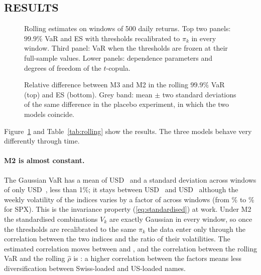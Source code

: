 \subsection{RESULTS}
\begin{table}[tb]
\caption{Rolling $99.9\%$ VaR and ES (USD),  windows of 500 daily returns, thresholds recalibrated in every window.}
\label{tab:rolling}
\centering
{}
\end{table}

\begin{figure}[p]
\centering
{}
\caption{Rolling estimates on windows of 500 daily returns. Top two panels: $99.9\%$ VaR and ES with thresholds recalibrated to $\pi_k$ in every window. Third panel: VaR when the thresholds are frozen at their full-sample values. Lower panels: dependence parameters and degrees of freedom of the $t$-copula.}
\label{fig:rolling}
\end{figure}

\begin{figure}[tb]
\centering
{}
\caption{Relative difference between M3 and M2 in the rolling $99.9\%$ VaR (top) and ES (bottom). Grey band: mean $\pm$ two standard deviations of the same difference in the placebo experiment, in which the two models coincide.}
\label{fig:rollingdiff}
\end{figure}

Figure~\ref{fig:rolling} and Table~\ref{tab:rolling} show the results. The three models behave very differently through time.

\paragraph{M2 is almost constant.}
The Gaussian VaR has a mean of USD~ and a standard deviation across windows of only USD~, less than 1\%; it stays between USD~ and USD~ although the weekly volatility of the indices varies by a factor of  across windows (from \% to \% for SPX). This is the invariance property (\ref{eq:standardised}) at work. Under M2 the standardised combinations $V_k$ are exactly Gaussian in every window, so once the thresholds are recalibrated to the same $\pi_k$ the data enter only through the correlation between the two indices and the ratio of their volatilities. The estimated correlation moves between  and , and the correlation between the rolling VaR and the rolling $\hat\rho$ is : a higher correlation between the factors means less diversification between Swiss-loaded and US-loaded names.

